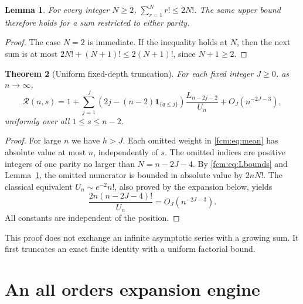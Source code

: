 \documentclass[11pt,letterpaper]{article}
\newtheorem{theorem}{Theorem}[section]
\newtheorem{lemma}[theorem]{Lemma}
\theoremstyle{remark}\newtheorem{remark}[theorem]{Remark}
\newcommand{\ind}{\mathbf 1}
\newcommand{\RR}{\mathcal R}
\begin{document}
\begin{lemma}\label{fcm:lem:factorial}
For every integer $N\ge2$, $\sum_{r=1}^N r!\le2N!$. The same upper bound therefore holds for a sum restricted to either parity.
\end{lemma}
\begin{proof}
The case $N=2$ is immediate. If the inequality holds at $N$, then the next sum is at most $2N!+(N+1)!\le2(N+1)!$, since $N+1\ge2$.
\end{proof}

\begin{theorem}[Uniform fixed-depth truncation]\label{fcm:thm:uniform}
For each fixed integer $J\ge0$, as $n\to\infty$,
\begin{equation}\label{fcm:eq:uniform}
 \RR(n,s)=1+\sum_{j=1}^{J}
 \left(2j-(n-2)\ind_{\{q\le j\}}\right)\frac{L_{n-2j-2}}{U_n}
 +O_J(n^{-2J-3}),
\end{equation}
uniformly over all $1\le s\le n-2$.
\end{theorem}
\begin{proof}
For large $n$ we have $h>J$. Each omitted weight in \eqref{fcm:eq:mean} has absolute value at most $n$, independently of $s$. The omitted indices are positive integers of one parity no larger than $N=n-2J-4$. By \eqref{fcm:eq:Lbounds} and Lemma~\ref{fcm:lem:factorial}, the omitted numerator is bounded in absolute value by $2nN!$. The classical equivalent $U_n\sim e^{-2}n!$, also proved by the expansion below, yields
\[
 \frac{2n(n-2J-4)!}{U_n}=O_J(n^{-2J-3}).
\]
All constants are independent of the position.
\end{proof}
This proof does not exchange an infinite asymptotic series with a growing sum. It first truncates an exact finite identity with a uniform factorial bound.

\section{An all orders expansion engine}
\end{document}
